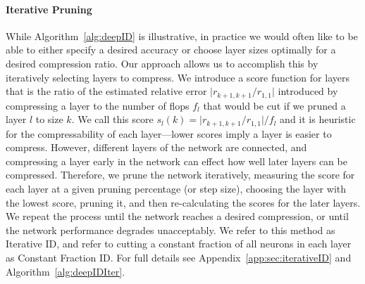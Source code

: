 \paragraph{Iterative Pruning}
While Algorithm~\ref{alg:deepID} is illustrative, in practice we would often like to be able to either specify a desired accuracy or choose layer sizes optimally for a desired compression ratio. Our approach allows us to accomplish this by iteratively selecting layers to compress. We introduce a score function for layers that is the ratio of the estimated relative error $\lvert r_{k+1,k+1} / r_{1,1}\rvert$ introduced by compressing a layer to the number of flops $f_l$ that would be cut if we pruned a layer $l$ to size $k$. We call this score $s_l(k)= \lvert r_{k+1,k+1} / r_{1,1}\rvert /f_l$ and it is heuristic for the compressability of each layer---lower scores imply a layer is easier to compress. However, different layers of the network are connected, and compressing a layer early in the network can effect how well later layers can be compressed.  
Therefore, we prune the network iteratively, measuring the score for each layer at a given pruning percentage (or step size), choosing the layer with the lowest score, pruning it, and then re-calculating the scores for the later layers. 
We repeat the process until the network reaches a desired compression, or until the network performance degrades unacceptably. 
We refer to this method as Iterative ID, and refer to cutting a constant fraction of all neurons in each layer as Constant Fraction ID.  
For full details see Appendix~\ref{app:sec:iterativeID} and Algorithm~\ref{alg:deepIDIter}.

